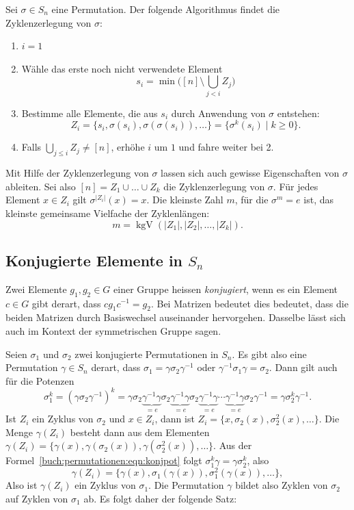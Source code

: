 \begin{satz}
Sei $\sigma\in S_n$ eine Permutation. Der folgende Algorithmus findet
die Zyklenzerlegung von $\sigma$:
\begin{enumerate}
\item
$i=1$
\item
Wähle das erste noch nicht verwendete Element
\[
s_i=\min\biggl( [n] \setminus \bigcup_{j< i} Z_j\biggr)
\]
\item
Bestimme alle Elemente, die aus $s_i$ durch Anwendung von $\sigma$
entstehen:
\[
Z_i
=
\{ s_i, \sigma(s_i), \sigma(\sigma(s_i)), \dots \}
=
\{\sigma^k(s_i)\;|\; k\ge 0\}.
\]
\item
Falls $\bigcup_{j\le i} Z_j\ne [n]$, erhöhe $i$ um $1$ und fahre 
weiter bei 2.
\end{enumerate}
\end{satz}

Mit Hilfe der Zyklenzerlegung von $\sigma$ lassen sich auch
gewisse Eigenschaften von $\sigma$ ableiten.
Sei also $[n] = Z_1\cup\dots\cup Z_k$ die Zyklenzerlegung von $\sigma$.
Für jedes Element $x\in Z_i$ gilt $\sigma^{|Z_i|}(x) = x$.
Die kleinste Zahl $m$, für die $\sigma^m=e$ ist, das kleinste
gemeinsame Vielfache der Zyklenlängen:
\[
m = \operatorname{kgV} (|Z_1|,|Z_2|,\dots,|Z_k|).
\]

\subsection{Konjugierte Elemente in $S_n$}
Zwei Elemente $g_1,g_2\in G$ einer Gruppe heissen {\em konjugiert}, wenn
es ein Element $c\in G$ gibt derart, dass $cg_1c^{-1}=g_2$.
Bei Matrizen bedeutet dies bedeutet, dass die beiden Matrizen durch
Basiswechsel auseinander hervorgehen.
Dasselbe lässt sich auch im Kontext der symmetrischen Gruppe sagen.

Seien $\sigma_1$ und $\sigma_2$ zwei konjugierte Permutationen in $S_n$.
Es gibt also eine Permutation $\gamma\in S_n$ derart, dass
$\sigma_1=\gamma\sigma_2\gamma^{-1}$ oder $\gamma^{-1}\sigma_1\gamma=\sigma_2$.
Dann gilt auch für die Potenzen
\begin{equation}
\sigma_1^k
=
(\gamma\sigma_2\gamma^{-1})^k
=
\gamma\sigma_2\underbrace{\gamma^{-1}
\gamma}_{\displaystyle=e}\sigma_2\underbrace{\gamma^{-1}
\gamma}_{\displaystyle=e}\sigma_2\underbrace{\gamma^{-1}\gamma}_{\displaystyle=e}
\cdots
\underbrace{\gamma^{-1}
\gamma}_{\displaystyle=e}\sigma_2\gamma^{-1}
=
\gamma\sigma_2^k\gamma^{-1}.
\label{buch:permutationen:eqn:konjpot}
\end{equation}
Ist $Z_i$ ein Zyklus von $\sigma_2$ und $x\in Z_i$, dann ist
$Z_i = \{ x,\sigma_2(x),\sigma_2^2(x),\dots\}$.
Die Menge $\gamma(Z_i)$ besteht dann aus dem Elementen
$\gamma(Z_i)=\{\gamma(x),\gamma(\sigma_2(x)),\gamma(\sigma_2^2(x)),\dots\}$.
Aus der Formel~\eqref{buch:permutationen:eqn:konjpot} folgt
$\sigma_1^k\gamma = \gamma\sigma_2^k$, also
\[
\gamma(Z_i)
=
\{\gamma(x),\sigma_1(\gamma(x)),\sigma_1^2(\gamma(x)),\dots\},
\]
Also ist $\gamma(Z_i)$ ein Zyklus von $\sigma_1$.
Die Permutation $\gamma$ bildet also Zyklen von $\sigma_2$ auf Zyklen
von $\sigma_1$ ab.
Es folgt daher der folgende Satz:


